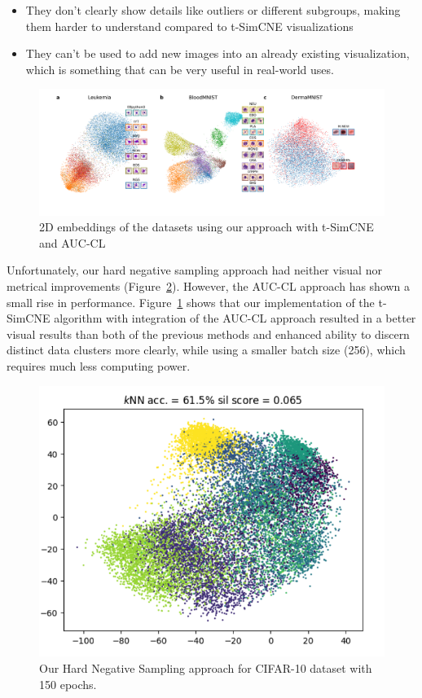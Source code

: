 \begin{itemize}
    \item They don't clearly show details like outliers or different subgroups, making them harder to understand compared to t-SimCNE visualizations
    \item They can't be used to add new images into an already existing visualization, which is something that can be very useful in real-world uses.
\end{itemize}

\begin{figure}[hbt]
\centering
\includegraphics[width=\textwidth]{figs/toy_datasets_long_2.png}
\caption{
2D embeddings of the datasets using our approach with t-SimCNE and AUC-CL
}
\label{fig:tsimcne_auc_cl}
\end{figure}


Unfortunately, our hard negative sampling approach had neither visual nor metrical improvements (Figure~\ref{fig:hardneg}). However, the AUC-CL approach has shown a small rise in performance. Figure~\ref{fig:tsimcne_auc_cl} shows that our implementation of the t-SimCNE algorithm with integration of the AUC-CL approach resulted in a better visual results than both of the previous methods and enhanced ability to discern distinct data clusters more clearly, while using a smaller batch size (256), which requires much less computing power.

\begin{figure}[hbt]
\centering
\includegraphics[width=\textwidth]{figs/hardneg.png}
\caption{
Our Hard Negative Sampling approach for CIFAR-10 dataset with 150 epochs.
}
\label{fig:hardneg}
\end{figure}

